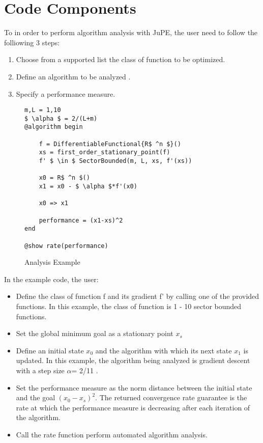\chapter{Code Components}

To in order to perform algorithm analysis with JuPE, the user need to follow the folliowing 3 steps:
\begin{enumerate}
	\item Choose from a supported list the class of function to be optimized.
	\item Define an algorithm to be analyzed .
	\item Specify a performance measure.
  \end{enumerate}
 
\begin{figure}[hbtp]
	\begin{lstlisting}[mathescape]
m,L = 1,10
$ \alpha $ = 2/(L+m)
@algorithm begin

	f = DifferentiableFunctional{R$ ^n $}()
	xs = first_order_stationary_point(f)
	f' $ \in $ SectorBounded(m, L, xs, f'(xs))

	x0 = R$ ^n $()
	x1 = x0 - $ \alpha $*f'(x0)

	x0 => x1

	performance = (x1-xs)^2
end

@show rate(performance)
\end{lstlisting}
\caption{Analysis Example }
\label{ex_analysis}
\end{figure}


In the example code, the user:
\begin{itemize}
	\item Define the class of function f  and its gradient f' by calling one of the provided functions. In this example, the class of function is 1 - 10 sector bounded functions. 
	\item Set the global minimum goal as a stationary point $ x_s $
	\item Define an initial state $ x_0 $ and the algorithm with which its next state $ x_1$ is updated. In this example, the algorithm being analyzed is gradient descent with a step size $ \alpha $= 2/11 .
	\item Set the performance measure as the norm distance between the initial state and the goal $ (x_0 - x_s)^2 $. The returned convergence rate guarantee is the rate at which the performance measure is decreasing after each iteration of the algorithm.
	\item Call the rate function  perform automated algorithm analysis.
\end{itemize}

